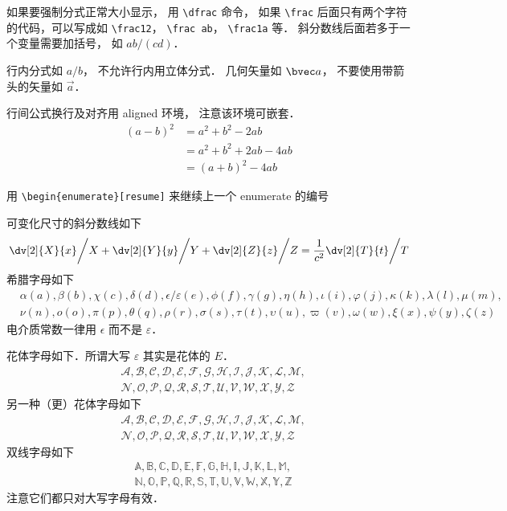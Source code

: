 如果要强制分式正常大小显示， 用 \verb|\dfrac| 命令， 如果 \verb|\frac| 后面只有两个字符的代码，可以写成如 \verb|\frac12|， \verb|\frac ab|， \verb|\frac1a| 等． 斜分数线后面若多于一个变量需要加括号， 如 $ab/(cd)$．

行内分式如 $a/b$， 不允许行内用立体分式． 几何矢量如 $\bvec a$， 不要使用带箭头的矢量如 $\vec a$． 

行间公式换行及对齐用 aligned 环境， 注意该环境可嵌套．
\begin{equation}
\begin{aligned}
(a-b)^2 &= a^2+b^2 - 2ab \\
& = a^2+b^2+2ab-4ab\\
& = (a+b)^2-4ab
\end{aligned}
\end{equation}

用 \verb|\begin{enumerate}[resume]|  来继续上一个 enumerate 的编号

可变化尺寸的斜分数线如下
\begin{equation}
\left. \dv[2]{X}{x} \middle/ X + \dv[2]{Y}{y} \middle/ Y + \dv[2]{Z}{z} \middle/ Z  = \frac{1}{c^2}  \dv[2]{T}{t} \middle/ T\right.
\end{equation}
希腊字母如下
\begin{equation}
\begin{aligned}
&\alpha (a), \beta (b), \chi (c), \delta (d), \epsilon/\varepsilon (e), \phi (f), \gamma (g),
\eta (h), \iota (i), \varphi (j), \kappa (k), \lambda (l), \mu (m),\\
& \nu (n), o (o), \pi (p), \theta (q), \rho (r), \sigma (s), \tau (t), \upsilon (u), \varpi (v), \omega (w), \xi (x), \psi (y), \zeta (z)
\end{aligned}
\end{equation}
电介质常数一律用 $\epsilon$ 而不是 $\varepsilon$．

花体字母如下．所谓大写 $\varepsilon$ 其实是花体的 $E$． 
\begin{equation}
\begin{aligned}
&\mathcal{A, B, C, D, E, F, G, H, I, J, K, L, M,}\\
&\mathcal{N, O, P, Q, R, S, T, U, V, W, X, Y, Z}
\end{aligned}
\end{equation}
另一种（更）花体字母如下
\begin{equation}
\begin{aligned}
&\mathscr{A, B, C, D, E, F, G, H, I, J, K, L, M,}\\
&\mathscr{N, O, P, Q, R, S, T, U, V, W, X, Y, Z}
\end{aligned}
\end{equation}
双线字母如下
\begin{equation}
\begin{aligned}
&\mathbb{A, B, C, D, E, F, G, H, I, J, K, L, M,}\\
&\mathbb{N, O, P, Q, R, S, T, U, V, W, X, Y, Z}
\end{aligned}
\end{equation}
注意它们都只对大写字母有效．

